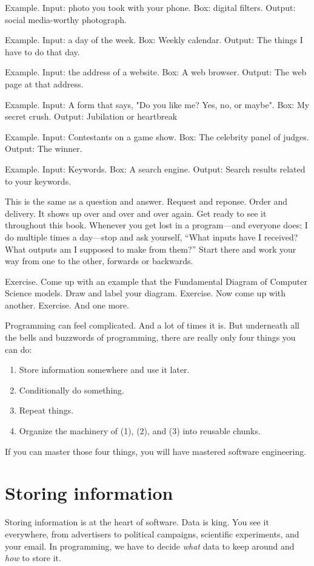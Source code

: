 Example. Input: photo you took with your phone. Box: digital filters. Output: social media-worthy photograph.

Example. Input: a day of the week. Box: Weekly calendar. Output: The things I have to do that day.

Example. Input: the address of a website. Box: A web browser. Output: The web page at that address.

Example. Input: A form that says, "Do you like me? Yes, no, or maybe". Box: My secret crush. Output: Jubilation or heartbreak

Example. Input: Contestants on a game show. Box: The celebrity panel of judges. Output: The winner.

Example. Input: Keywords. Box: A search engine. Output: Search results related to your keywords.

This is the same as a question and answer. Request and reponse. Order and delivery. It shows up over and over and over again. Get ready to see it throughout this book. Whenever you get lost in a program---and everyone does; I do multiple times a day---stop and ask yourself, ``What inputs have I received? What outputs am I supposed to make from them?'' Start there and work your way from one to the other, forwards or backwards.

Exercise. Come up with an example that the Fundamental Diagram of Computer Science models. Draw and label your diagram.
Exercise. Now come up with another.
Exercise. And one more.


Programming can feel complicated. And a lot of times it is. But underneath all the bells and buzzwords of programming, there are really only four things you can do:

\begin{enumerate}
  \item Store information somewhere and use it later.
  \item Conditionally do something.
  \item Repeat things.
  \item Organize the machinery of (1), (2), and (3) into reusable chunks.
\end{enumerate}

If you can master those four things, you will have mastered software engineering.

\section{Storing information}
Storing information is at the heart of software. Data is king. You see it everywhere, from advertisers to political campaigns, scientific experiments, and your email. In programming, we have to decide \textit{what} data to keep around and \textit{how} to store it.

